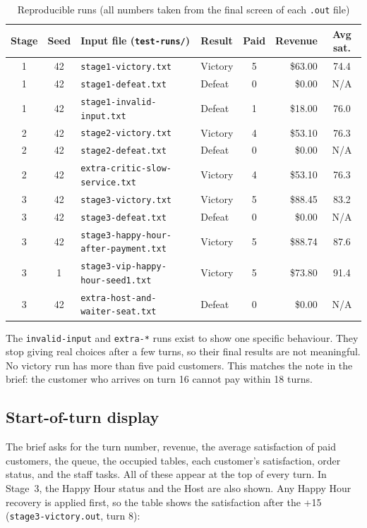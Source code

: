 \begin{table}[H]
\centering
\small
\caption{Reproducible runs (all numbers taken from the final screen of each \texttt{.out} file)}
\label{tab:runs}
\begin{tabular}{@{}c c l l c r c@{}}
\toprule
Stage & Seed & Input file (\texttt{test-runs/}) & Result & Paid & Revenue & Avg sat. \\
\midrule
1 & 42 & \texttt{stage1-victory.txt}                  & Victory & 5 & \$63.00 & 74.4 \\
1 & 42 & \texttt{stage1-defeat.txt}                   & Defeat  & 0 & \$0.00  & N/A  \\
1 & 42 & \texttt{stage1-invalid-input.txt}            & Defeat  & 1 & \$18.00 & 76.0 \\
2 & 42 & \texttt{stage2-victory.txt}                  & Victory & 4 & \$53.10 & 76.3 \\
2 & 42 & \texttt{stage2-defeat.txt}                   & Defeat  & 0 & \$0.00  & N/A  \\
2 & 42 & \texttt{extra-critic-slow-service.txt}       & Victory & 4 & \$53.10 & 76.3 \\
3 & 42 & \texttt{stage3-victory.txt}                  & Victory & 5 & \$88.45 & 83.2 \\
3 & 42 & \texttt{stage3-defeat.txt}                   & Defeat  & 0 & \$0.00  & N/A  \\
3 & 42 & \texttt{stage3-happy-hour-after-payment.txt} & Victory & 5 & \$88.74 & 87.6 \\
3 & 1  & \texttt{stage3-vip-happy-hour-seed1.txt}     & Victory & 5 & \$73.80 & 91.4 \\
3 & 42 & \texttt{extra-host-and-waiter-seat.txt}      & Defeat  & 0 & \$0.00  & N/A  \\
\bottomrule
\end{tabular}
\end{table}

The \texttt{invalid-input} and \texttt{extra-*} runs exist to show one specific behaviour.
They stop giving real choices after a few turns, so their final results are not
meaningful. No victory run has more than five paid customers. This matches the note in
the brief: the customer who arrives on turn 16 cannot pay within 18 turns.

\subsection{Start-of-turn display}

The brief asks for the turn number, revenue, the average satisfaction of paid customers,
the queue, the occupied tables, each customer's satisfaction, order status, and the staff
tasks. All of these appear at the top of every turn. In Stage~3, the Happy Hour status
and the Host are also shown. Any Happy Hour recovery is applied first, so the table
shows the satisfaction after the +15 (\texttt{stage3-victory.out}, turn 8):

